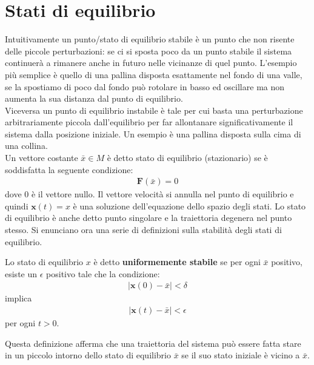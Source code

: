 
\section{Stati di equilibrio} %
\label{sub:stabilità_degli_stati_di_equilibrio}
Intuitivamente un punto/stato di equilibrio stabile è un punto che non risente delle piccole perturbazioni: se ci si sposta poco da un punto stabile il sistema continuerà a rimanere anche in futuro nelle vicinanze di quel punto. L'esempio più semplice è quello di una pallina disposta esattamente nel fondo di una valle, se la spostiamo di poco dal fondo può rotolare in basso ed oscillare ma non aumenta la sua distanza dal punto di equilibrio.\\

Viceversa un punto di equilibrio instabile è tale per cui basta una perturbazione arbitrariamente piccola dall'equilibrio per far allontanare significativamente il sistema dalla posizione iniziale. Un esempio è una pallina disposta sulla cima di una collina.\\

Un vettore costante $\bar{x}\in M$ è detto stato di equilibrio (stazionario) se è soddisfatta la seguente condizione:
\begin{align*}
    \mathbf{F}(\bar{x}) = 0
\end{align*}
dove 0 è il vettore nullo. Il vettore velocità si annulla nel punto di equilibrio e quindi $\mathbf{x}(t) = x$ è una soluzione dell'equazione dello spazio degli stati. Lo stato di equilibrio è anche detto punto singolare e la traiettoria degenera nel punto stesso. Si enunciano ora una serie di definizioni sulla stabilità degli stati di equilibrio.

\begin{mydef}
    Lo stato di equilibrio $x$ è detto \textbf{uniformemente stabile} se per ogni $\bar{x}$ positivo, esiste un $\epsilon$ positivo tale che la condizione:
    \begin{align*}
        \left|\mathbf{x}(0) - \bar{x} \right| < \delta
    \end{align*}
    implica
    \begin{align*}
        \left|\mathbf{x}(t) - \bar{x} \right| < \epsilon
    \end{align*}
    per ogni $t > 0$.
\end{mydef}

Questa definizione afferma che una traiettoria del sistema può essere fatta stare in un piccolo
intorno dello stato di equilibrio $\bar{x}$ se il suo stato iniziale è vicino a $\bar{x}$.

